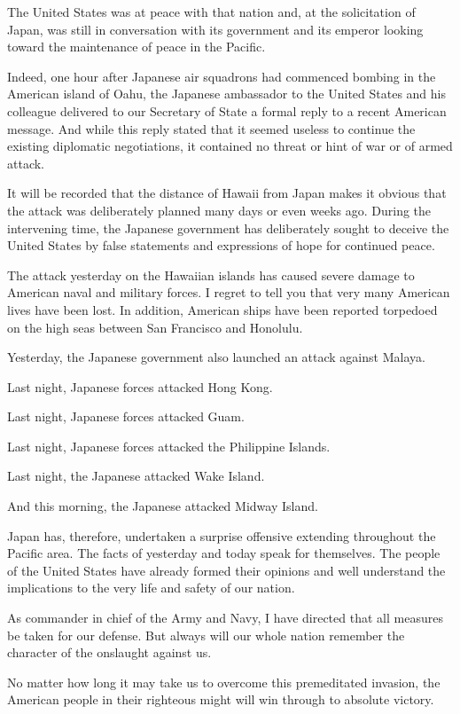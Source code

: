 \documentclass[a4paper]{amsbook}
\begin{document}
The United States was at peace with that nation and, at the solicitation of Japan, was still in conversation with its government and its emperor looking toward the maintenance of peace in the Pacific.

Indeed, one hour after Japanese air squadrons had commenced bombing in the American island of Oahu, the Japanese ambassador to the United States and his colleague delivered to our Secretary of State a formal reply to a recent American message. And while this reply stated that it seemed useless to continue the existing diplomatic negotiations, it contained no threat or hint of war or of armed attack.

It will be recorded that the distance of Hawaii from Japan makes it obvious that the attack was deliberately planned many days or even weeks ago. During the intervening time, the Japanese government has deliberately sought to deceive the United States by false statements and expressions of hope for continued peace.

The attack yesterday on the Hawaiian islands has caused severe damage to American naval and military forces. I regret to tell you that very many American lives have been lost. In addition, American ships have been reported torpedoed on the high seas between San Francisco and Honolulu.

Yesterday, the Japanese government also launched an attack against Malaya.

Last night, Japanese forces attacked Hong Kong.

Last night, Japanese forces attacked Guam.

Last night, Japanese forces attacked the Philippine Islands.

Last night, the Japanese attacked Wake Island.

And this morning, the Japanese attacked Midway Island.

Japan has, therefore, undertaken a surprise offensive extending throughout the Pacific area. The facts of yesterday and today speak for themselves. The people of the United States have already formed their opinions and well understand the implications to the very life and safety of our nation.

As commander in chief of the Army and Navy, I have directed that all measures be taken for our defense. But always will our whole nation remember the character of the onslaught against us.

No matter how long it may take us to overcome this premeditated invasion, the American people in their righteous might will win through to absolute victory.
\end{document}
